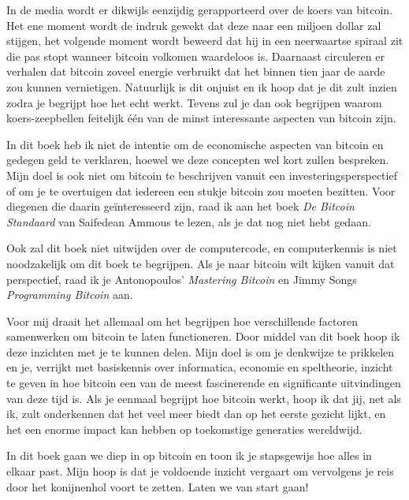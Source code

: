 In de media wordt er dikwijls eenzijdig gerapporteerd over de koers van bitcoin. Het ene moment wordt de indruk gewekt dat deze naar een miljoen dollar zal stijgen, het volgende moment wordt beweerd dat hij in een neerwaartse spiraal zit die pas stopt wanneer bitcoin volkomen waardeloos is. Daarnaast circuleren er verhalen dat bitcoin zoveel energie verbruikt dat het binnen tien jaar de aarde zou kunnen vernietigen. Natuurlijk is dit onjuist en ik hoop dat je dit zult inzien zodra je begrijpt hoe het echt werkt. Tevens zul je dan ook begrijpen waarom koers-zeepbellen feitelijk één van de minst interessante aspecten van bitcoin zijn.

In dit boek heb ik niet de intentie om de economische aspecten van bitcoin en gedegen geld te verklaren, hoewel we deze concepten wel kort zullen bespreken. Mijn doel is ook niet om bitcoin te beschrijven vanuit een investeringsperspectief of om je te overtuigen dat iedereen een stukje bitcoin zou moeten bezitten. Voor diegenen die daarin geïnteresseerd zijn, raad ik aan het boek \textit{De Bitcoin Standaard} van Saifedean Ammous te lezen, als je dat nog niet hebt gedaan.

Ook zal dit boek niet uitwijden over de computercode, en computerkennis is niet noodzakelijk om dit boek te begrijpen. Als je naar bitcoin wilt kijken vanuit dat perspectief, raad ik je Antonopoulos' \textit{Mastering Bitcoin} en Jimmy Songs \textit{Programming Bitcoin} aan.

Voor mij draait het allemaal om het begrijpen hoe verschillende factoren samenwerken om bitcoin te laten functioneren. Door middel van dit boek hoop ik deze inzichten met je te kunnen delen. Mijn doel is om je denkwijze te prikkelen en je, verrijkt met basiskennis over informatica, economie en speltheorie, inzicht te geven in hoe bitcoin een van de meest fascinerende en significante uitvindingen van deze tijd is. Als je eenmaal begrijpt hoe bitcoin werkt, hoop ik dat jij, net als ik, zult onderkennen dat het veel meer biedt dan op het eerste gezicht lijkt, en het een enorme impact kan hebben op toekomstige generaties wereldwijd.

In dit boek gaan we diep in op bitcoin en toon ik je stapsgewijs hoe alles in elkaar past. Mijn hoop is dat je voldoende inzicht vergaart om vervolgens je reis door het konijnenhol voort te zetten. Laten we van start gaan! 

\clearpage



